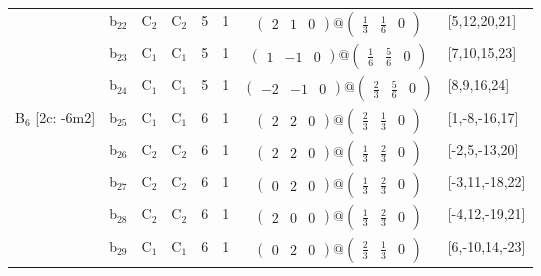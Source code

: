 \documentclass[fleqn,10pt,landscape]{article}
\begin{document}
\begin{itemize}
\begin{center}
\begin{longtable}{cc|cc|c|c|c|l}
& b$_{22}$ & C$_{2}$ & C$_{2}$ & 5 & 1 & $\begin{pmatrix} 2 & 1 & 0 \end{pmatrix}@\begin{pmatrix} \frac{1}{3} & \frac{1}{6} & 0 \end{pmatrix}$ & [5,12,20,21] \\
& b$_{23}$ & C$_{1}$ & C$_{1}$ & 5 & 1 & $\begin{pmatrix} 1 & -1 & 0 \end{pmatrix}@\begin{pmatrix} \frac{1}{6} & \frac{5}{6} & 0 \end{pmatrix}$ & [7,10,15,23] \\
& b$_{24}$ & C$_{1}$ & C$_{1}$ & 5 & 1 & $\begin{pmatrix} -2 & -1 & 0 \end{pmatrix}@\begin{pmatrix} \frac{2}{3} & \frac{5}{6} & 0 \end{pmatrix}$ & [8,9,16,24] \\ \hline
B$_{6}$ [2c: -6m2] & b$_{25}$ & C$_{1}$ & C$_{1}$ & 6 & 1 & $\begin{pmatrix} 2 & 2 & 0 \end{pmatrix}@\begin{pmatrix} \frac{2}{3} & \frac{1}{3} & 0 \end{pmatrix}$ & [1,-8,-16,17] \\
& b$_{26}$ & C$_{2}$ & C$_{2}$ & 6 & 1 & $\begin{pmatrix} 2 & 2 & 0 \end{pmatrix}@\begin{pmatrix} \frac{1}{3} & \frac{2}{3} & 0 \end{pmatrix}$ & [-2,5,-13,20] \\
& b$_{27}$ & C$_{2}$ & C$_{2}$ & 6 & 1 & $\begin{pmatrix} 0 & 2 & 0 \end{pmatrix}@\begin{pmatrix} \frac{1}{3} & \frac{2}{3} & 0 \end{pmatrix}$ & [-3,11,-18,22] \\
& b$_{28}$ & C$_{2}$ & C$_{2}$ & 6 & 1 & $\begin{pmatrix} 2 & 0 & 0 \end{pmatrix}@\begin{pmatrix} \frac{1}{3} & \frac{2}{3} & 0 \end{pmatrix}$ & [-4,12,-19,21] \\
& b$_{29}$ & C$_{1}$ & C$_{1}$ & 6 & 1 & $\begin{pmatrix} 0 & 2 & 0 \end{pmatrix}@\begin{pmatrix} \frac{2}{3} & \frac{1}{3} & 0 \end{pmatrix}$ & [6,-10,14,-23] \\

\end{longtable}
\end{center}
\end{itemize}
\end{document}
